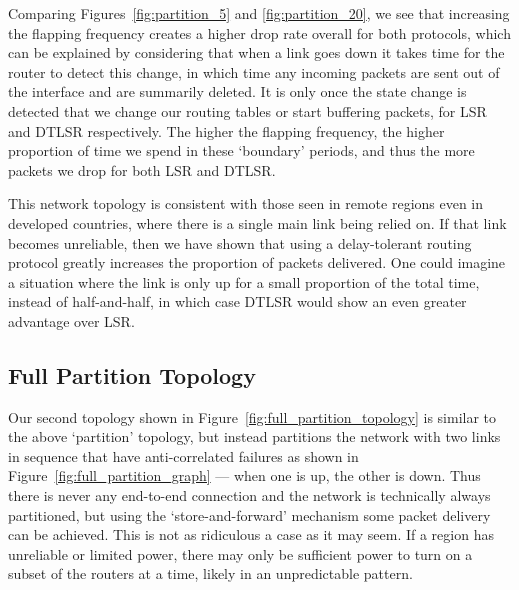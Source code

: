 \documentclass[withindex,glossary,openany]{cam-thesis}
\begin{document}
Comparing Figures~\ref{fig:partition_5} and \ref{fig:partition_20}, we see that increasing the flapping frequency creates a higher drop rate overall for both protocols, which can be explained by considering that when a link goes down it takes time for the router to detect this change, in which time any incoming packets are sent out of the interface and are summarily deleted. It is only once the state change is detected that we change our routing tables or start buffering packets, for LSR and DTLSR respectively. The higher the flapping frequency, the higher proportion of time we spend in these `boundary' periods, and thus the more packets we drop for both LSR and DTLSR.

This network topology is consistent with those seen in remote regions even in developed countries, where there is a single main link being relied on. If that link becomes unreliable, then we have shown that using a delay-tolerant routing protocol greatly increases the proportion of packets delivered. One could imagine a situation where the link is only up for a small proportion of the total time, instead of half-and-half, in which case DTLSR would show an even greater advantage over LSR.


\subsection{Full Partition Topology}

Our second topology shown in Figure~\ref{fig:full_partition_topology} is similar to the above `partition' topology, but instead partitions the network with two links in sequence that have anti-correlated failures as shown in Figure~\ref{fig:full_partition_graph} --- when one is up, the other is down. Thus there is never any end-to-end connection and the network is technically always partitioned, but using the `store-and-forward' mechanism some packet delivery can be achieved. This is not as ridiculous a case as it may seem. If a region has unreliable or limited power, there may only be sufficient power to turn on a subset of the routers at a time, likely in an unpredictable pattern.
\end{document}
